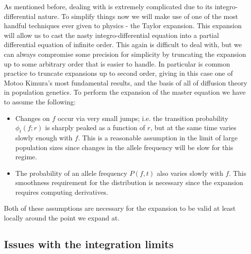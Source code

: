 As mentioned before, dealing with  is extremely
complicated due to its integro-differential nature. To simplify things now we
will make use of one of the most handful techniques ever given to physics - the
Taylor expansion. This expansion will allow us to cast the nasty
integro-differential equation into a partial differential equation of infinite
order. This again is difficult to deal with, but we can always compromise some
precision for simplicity by truncating the expansion up to some arbitrary order
that is easier to handle. In particular is common practice to truncate
expansions up to second order, giving in this case one of Motoo Kimura's most
fundamental results, and the basis of all of diffusion theory in population
genetics. To perform the expansion of the master equation we have to assume the
following:
\begin{itemize}
  \item Changes on $f$ occur via very small jumps; i.e. the transition
  probability $\phi_t(f; r)$ is sharply peaked as a function of $r$, but at the
  same time varies slowly enough with $f$. This is a reasonable assumption in
  the limit of large population sizes since changes in the allele frequency
  will be slow for this regime.
  \item The probability of an allele frequency $P(f, t)$ also varies slowly
  with $f$. This smoothness requirement for the distribution is necessary since
  the expansion requires computing derivatives.
\end{itemize}
Both of these assumptions are necessary for the expansion to be valid at least
locally around the point we expand at.

\subsection{Issues with the integration limits}

